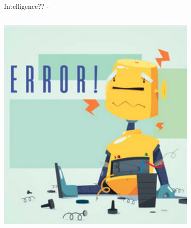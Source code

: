 \begin{frame}[t,allowframebreaks]{Intelligence?? -}
    \framebreak

    \begin{columns}
        \begin{column}{0.30\textwidth}
         \begin{center}
          \includegraphics[width=0.98\textwidth]{./images/misc/malfunctioning_robot_1.png}\\
         \end{center}
        \end{column}
        \begin{column}{0.70\textwidth}


\end{column}
\end{columns}
\end{frame}
